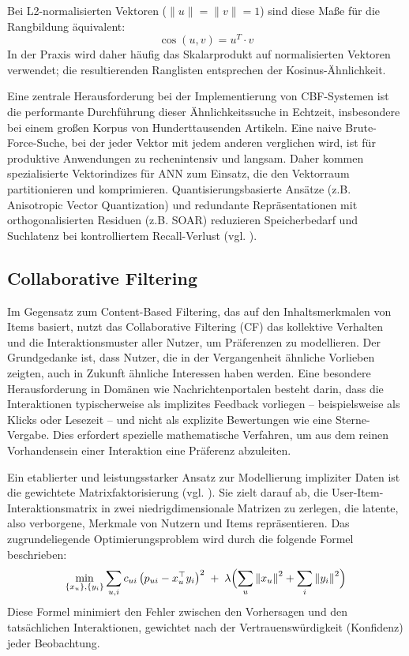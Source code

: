 Bei L2-normalisierten Vektoren ($\lVert u \rVert = \lVert v \rVert = 1$) sind diese Maße für die Rangbildung äquivalent:
\[
\cos(u,v) = u^{T} \cdot v
\]
In der Praxis wird daher häufig das Skalarprodukt auf normalisierten Vektoren verwendet; 
die resultierenden Ranglisten entsprechen der Kosinus-Ähnlichkeit.

Eine zentrale Herausforderung bei der Implementierung von CBF-Systemen ist die performante Durchführung 
dieser Ähnlichkeitssuche in Echtzeit, insbesondere bei einem großen Korpus von Hunderttausenden Artikeln. %
Eine naive Brute-Force-Suche, bei der jeder Vektor mit jedem anderen verglichen wird, ist für produktive Anwendungen 
zu rechenintensiv und langsam. Daher kommen spezialisierte Vektorindizes für \ac{ANN} zum Einsatz, 
die den Vektorraum partitionieren und komprimieren. Quantisierungsbasierte Ansätze (z.B. Anisotropic Vector Quantization) 
und redundante Repräsentationen mit orthogonalisierten Residuen (z.B. \ac{SOAR}) reduzieren Speicherbedarf und Suchlatenz 
bei kontrolliertem Recall-Verlust (vgl. \cite{avq_2020,soar_2023}).

\subsection{Collaborative Filtering}
\label{sec:cf}

Im Gegensatz zum Content-Based Filtering, das auf den Inhaltsmerkmalen von Items basiert, 
nutzt das Collaborative Filtering (CF) das kollektive Verhalten und die Interaktionsmuster 
aller Nutzer, um Präferenzen zu modellieren. Der Grundgedanke ist, dass Nutzer, die in der 
Vergangenheit ähnliche Vorlieben zeigten, auch in Zukunft ähnliche Interessen haben werden. 
Eine besondere Herausforderung in Domänen wie Nachrichtenportalen besteht darin, dass die 
Interaktionen typischerweise als implizites Feedback vorliegen – beispielsweise als Klicks 
oder Lesezeit – und nicht als explizite Bewertungen wie eine Sterne-Vergabe. Dies erfordert 
spezielle mathematische Verfahren, um aus dem reinen Vorhandensein einer Interaktion eine 
Präferenz abzuleiten.

Ein etablierter und leistungsstarker Ansatz zur Modellierung impliziter Daten ist die 
gewichtete Matrixfaktorisierung (vgl. \cite{hu_collaborative_2008}). Sie zielt 
darauf ab, die User-Item-Interaktionsmatrix in zwei niedrigdimensionale Matrizen zu 
zerlegen, die latente, also verborgene, Merkmale von Nutzern und Items repräsentieren. 
Das zugrundeliegende Optimierungsproblem wird durch die folgende Formel beschrieben:
\begin{equation}
\label{eq:cf}
\min_{\{x_u\},\{y_i\}} \sum_{u,i} c_{ui}\,\bigl(p_{ui} - x_u^\top y_i\bigr)^2 \;+\; \lambda \Bigl(\sum_u \left\lVert x_u\right\rVert^2 + \sum_i \left\lVert y_i\right\rVert^2\Bigr)
\end{equation}
Diese Formel minimiert den Fehler zwischen den Vorhersagen und den tatsächlichen 
Interaktionen, gewichtet nach der Vertrauenswürdigkeit (Konfidenz) jeder Beobachtung.

